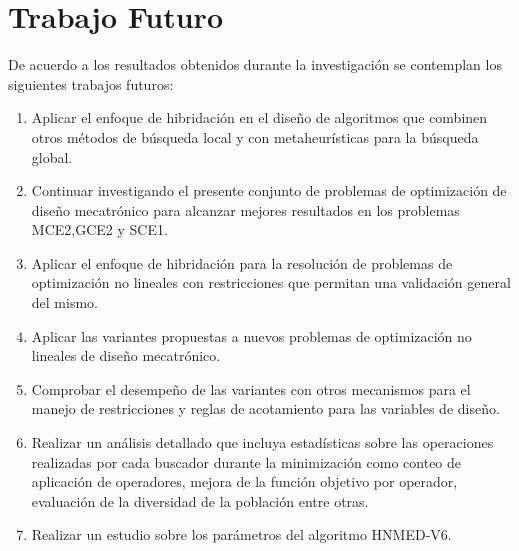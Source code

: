  \section{Trabajo Futuro}
 De acuerdo a los resultados obtenidos durante la investigación se contemplan los siguientes trabajos futuros:
 \begin{enumerate}
    \item Aplicar el enfoque de hibridación en el diseño de algoritmos que combinen otros métodos de búsqueda local y con metaheurísticas para la búsqueda global. 
    \item Continuar investigando el presente conjunto de problemas de optimización de diseño mecatrónico para alcanzar mejores resultados en los problemas MCE2,GCE2 y SCE1.
    \item Aplicar el enfoque de hibridación para la resolución de problemas de optimización no lineales con restricciones que permitan una validación general del mismo. 
    \item Aplicar las variantes propuestas a nuevos problemas de optimización no lineales de diseño mecatrónico.
    \item Comprobar el desempeño de las variantes con otros mecanismos para el manejo de restricciones y reglas de acotamiento para las variables de diseño.
    \item Realizar un análisis detallado que incluya estadísticas sobre las operaciones realizadas por cada buscador durante la minimización como  conteo de aplicación de operadores, mejora de la función objetivo por operador, evaluación de la diversidad de la población entre otras.
    \item Realizar un estudio sobre los parámetros del algoritmo HNMED-V6.
 
 \end{enumerate}
 